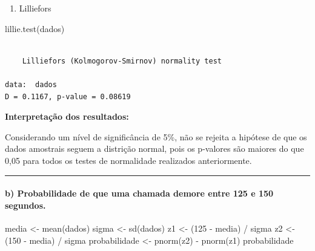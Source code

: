 \documentclass[
  letterpaper,
  DIV=11,
  numbers=noendperiod]{scrartcl}
\let\oldparagraph\paragraph
\renewcommand{\paragraph}[1]{\oldparagraph{#1}\mbox{}}
\newenvironment{Shaded}{\begin{snugshade}}{\end{snugshade}}
\newcommand{\DecValTok}[1]{\textcolor[rgb]{0.68,0.00,0.00}{#1}}
\newcommand{\FunctionTok}[1]{\textcolor[rgb]{0.28,0.35,0.67}{#1}}
\newcommand{\NormalTok}[1]{\textcolor[rgb]{0.00,0.23,0.31}{#1}}
\newcommand{\OtherTok}[1]{\textcolor[rgb]{0.00,0.23,0.31}{#1}}
\newcommand{\SpecialCharTok}[1]{\textcolor[rgb]{0.37,0.37,0.37}{#1}}
\providecommand{\tightlist}{%
  \setlength{\itemsep}{0pt}\setlength{\parskip}{0pt}}\usepackage{longtable,booktabs,array}
\begin{document}
\begin{enumerate}
\def\labelenumi{\roman{enumi})}
\setcounter{enumi}{3}
\tightlist
\item
  Lilliefors
\end{enumerate}

\begin{Shaded}
\begin{Highlighting}[]
\FunctionTok{lillie.test}\NormalTok{(dados)}
\end{Highlighting}
\end{Shaded}

\begin{verbatim}

    Lilliefors (Kolmogorov-Smirnov) normality test

data:  dados
D = 0.1167, p-value = 0.08619
\end{verbatim}

\textbf{Interpretação dos resultados:}

Considerando um nível de significância de 5\%, não se rejeita a hipótese
de que os dados amostrais seguem a distrição normal, pois os p-valores
são maiores do que 0,05 para todos os testes de normalidade realizados
anteriormente.

\begin{center}\rule{0.5\linewidth}{0.5pt}\end{center}

\hypertarget{b-probabilidade-de-que-uma-chamada-demore-entre-125-e-150-segundos.}{%
\paragraph{b) Probabilidade de que uma chamada demore entre 125 e 150
segundos.}\label{b-probabilidade-de-que-uma-chamada-demore-entre-125-e-150-segundos.}}

\begin{Shaded}
\begin{Highlighting}[]
\NormalTok{media }\OtherTok{\textless{}{-}} \FunctionTok{mean}\NormalTok{(dados)}
\NormalTok{sigma }\OtherTok{\textless{}{-}} \FunctionTok{sd}\NormalTok{(dados)}
\NormalTok{z1 }\OtherTok{\textless{}{-}}\NormalTok{ (}\DecValTok{125}  \SpecialCharTok{{-}}\NormalTok{ media) }\SpecialCharTok{/}\NormalTok{ sigma}
\NormalTok{z2 }\OtherTok{\textless{}{-}}\NormalTok{ (}\DecValTok{150}  \SpecialCharTok{{-}}\NormalTok{ media) }\SpecialCharTok{/}\NormalTok{ sigma}
\NormalTok{probabilidade }\OtherTok{\textless{}{-}} \FunctionTok{pnorm}\NormalTok{(z2) }\SpecialCharTok{{-}} \FunctionTok{pnorm}\NormalTok{(z1)}
\NormalTok{probabilidade}
\end{Highlighting}
\end{Shaded}
\end{document}
